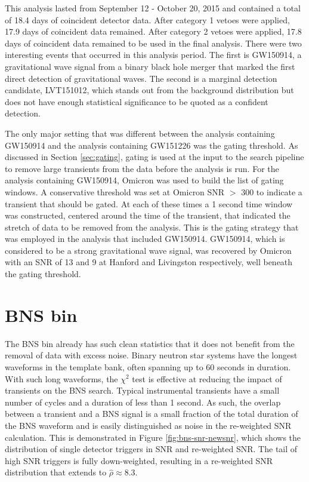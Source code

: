 This analysis lasted from September 12 - October 20, 2015 and contained a total
of 18.4 days of coincident detector data. After category 1 vetoes were applied, 17.9 days
of coincident data remained. After category 2 vetoes were applied, 17.8 days of coincident
data remained to be used in the final analysis. There were two interesting events that
occurred in this analysis period. The first is GW150914, a gravitational wave signal
from a binary black hole merger that marked the first direct detection of
gravitational waves\cite{GW150914-DETECTION}. The second is a marginal
detection candidate, LVT151012, which stands out
from the background distribution but does not have enough statistical
significance to be quoted as a confident detection.

The only major setting that was different between the analysis containing GW150914 
and the analysis containing GW151226 was the gating threshold. As discussed in 
Section \ref{sec:gating}, gating is used at the input to the search pipeline to 
remove large transients from the data before the analysis is run. 
For the analysis containing GW150914, Omicron 
was used to build the list of gating windows. A conservative threshold was set at Omicron SNR $>$ 300
to indicate a transient that should be gated. At each of these times a 1 second time window was constructed,
centered around the time of the transient, that indicated the stretch of data to be removed from the analysis.
This is the gating strategy that was employed in the analysis that included GW150914.
GW150914, which is considered to be a strong gravitational wave signal, was recovered by Omicron with an SNR
of 13 and 9 at Hanford and Livingston respectively, well beneath the gating threshold.

\section{BNS bin}

The BNS bin already has such clean statistics that it does not benefit from the
removal of data with excess noise.
Binary neutron star systems have the longest waveforms in the template bank, often spanning up
to 60 seconds in duration. With such long waveforms, the $\chi^{2}$ test is effective at
reducing the impact of transients on the BNS search. Typical instrumental transients have a small
number of cycles and a duration of less than 1 second. As such, the overlap between a transient
and a BNS signal is a small fraction of the total duration of the BNS waveform and is easily
distinguished as noise in the re-weighted SNR calculation. This is demonstrated in Figure
\ref{fig:bns-snr-newsnr}, which shows the distribution of single detector triggers in SNR
and re-weighted SNR. The tail of high SNR triggers is fully down-weighted, resulting in a
re-weighted SNR distribution that extends to $\hat{\rho} \approx 8.3$.

